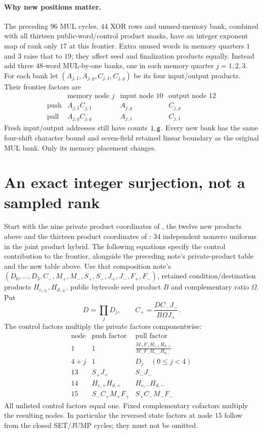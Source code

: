 \documentclass[11pt]{article}
\begin{document}
\paragraph{Why new positions matter.} The preceding $96$ MUL cycles, $44$ XOR rows and unused-memory bank, combined with all thirteen public-word/control product masks, have an integer exponent map of rank only $17$ at this frontier. Extra unused words in memory quarters $1$ and $3$ raise that to $19$; they affect seed and finalization products equally. Instead add three $48$-word MUL-by-one banks, one in each memory quarter $j=1,2,3$. For each bank let $(A_{j,1},A_{j,g},C_{j,1},C_{j,g})$ be its four input/output products. Their frontier factors are
\[
\begin{array}{c|ccc}
 &\text{memory node }j&\text{input node }10&\text{output node }12\\\hline
 \text{push}&A_{j,1}C_{j,1}&A_{j,g}&C_{j,g}\\
 \text{pull}&A_{j,g}C_{j,g}&A_{j,1}&C_{j,1}
\end{array}
\]
Fresh input/output addresses still have counts $1,\mathsf{g}$. Every new bank has the same four-shift character bound and seven-field retained linear boundary as the original MUL bank. Only its memory placement changes.

\section{An exact integer surjection, not a sampled rank}

Start with the nine private product coordinates of , the twelve new products above and the thirteen product coordinates of : $34$ independent nonzero uniforms in the joint product hybrid. The following equations specify the control contribution to the frontier, alongside the preceding note's private-product table and the new table above. Use that composition note's $(D_0,\ldots,D_3,C_-,M_+,M_-,S_+,S_-,J_+,J_-,F_+,F_-)$, retained condition/destination products $H_{c,\pm},H_{d,\pm}$, public bytecode seed product $B$ and complementary ratio $\Omega$. Put
\[
 D=\prod_jD_j,\qquad C_+=\frac{DC_-J_-}{B\Omega J_+}.
\]
The control factors multiply the private factors componentwise:
\[
\begin{array}{c|cc}
 \text{node}&\text{push factor}&\text{pull factor}\\\hline
 1&1&\displaystyle\frac{M_+F_+H_{c,+}H_{d,+}}{M_-F_-H_{c,-}H_{d,-}}\\[1ex]
 4+j&1&D_j\quad(0\le j<4)\\
 13&S_+J_+&S_-J_-\\
 14&H_{c,+}H_{d,+}&H_{c,-}H_{d,-}\\
 15&S_-C_+M_+F_+&S_+C_-M_-F_-
\end{array}
\]
All unlisted control factors equal one. Fixed complementary cofactors multiply the resulting nodes. In particular the reversed state factors at node $15$ follow from the closed SET/JUMP cycles; they must not be omitted.
\end{document}
